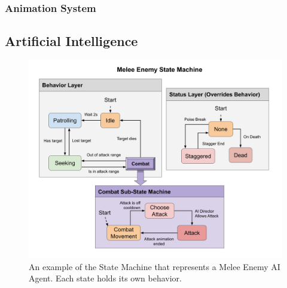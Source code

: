 \subsubsection{Animation System}





\subsection{Artificial Intelligence}





\begin{figure}[!ht]
    \caption{An example of the State Machine that represents a Melee Enemy AI Agent. Each state holds its own behavior.}
    \begin{center}
        \includegraphics[width=34em]{figures/fig-melee-ai-state-machine.png}
    \end{center}
    \label{fig:fig-ai-state-machine}
\end{figure}

